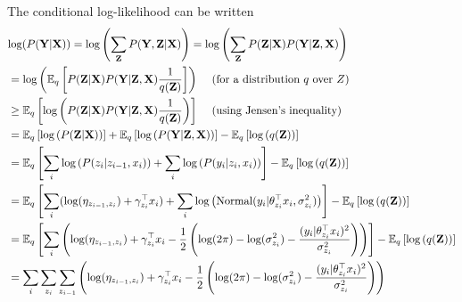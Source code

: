 \documentclass[12pt]{article}
\begin{document}
The conditional log-likelihood can be written
\begin{equation*}
    \begin{split}
        &\text{log}(P(\textbf{Y} | \textbf{X})) = \text{log} \left( \sum_{\textbf{Z}} P(\textbf{Y},\textbf{Z} | \textbf{X}) \right)
             = \text{log} \left( \sum_{\textbf{Z}} P(\textbf{Z} | \textbf{X}) P(\textbf{Y} | \textbf{Z}, \textbf{X}) \right)\\
        & =  \text{log} \left( \mathbb{E}_q \left[ P(\textbf{Z} | \textbf{X}) P(\textbf{Y} | \textbf{Z}, \textbf{X}) \frac{1}{q(\textbf{Z})} \right] \right)
             \text{ \hspace{3mm}(for a distribution $q$ over $Z$)}\\
        & \geq  \mathbb{E}_q \left[  \text{log} \left( P(\textbf{Z} | \textbf{X}) P(\textbf{Y} | \textbf{Z}, \textbf{X}) 
            \frac{1}{q(\textbf{Z})} \right) \right]
             \text{ \hspace{3mm}(using Jensen's inequality)}\\
        & = \mathbb{E}_q \left[ \text{log} \left( P(\textbf{Z} | \textbf{X}) \right) \right] 
             + \mathbb{E}_q \left[\text{log} \left( P(\textbf{Y} | \textbf{Z}, \textbf{X}) \right) \right] 
             - \mathbb{E}_q \left[\text{log} \left( q(\textbf{Z}) \right) \right] \\
        & = \mathbb{E}_q \left[ \sum_i \text{log} \left( P(z_i | z_{i-1}, x_i) \right)
             + \sum_i \text{log} \left( P(y_i | z_i, x_i) \right) \right] 
             - \mathbb{E}_q \left[\text{log} \left( q(\textbf{Z}) \right) \right] \\
        & = \mathbb{E}_q \left[ \sum_i (\text{log}(\eta_{z_{i-1},z_i}) + \gamma_{z_i}^{\top} x_i )
             + \sum_i \text{log} \left( \text{Normal}(y_i | \theta_{z_i}^{\top} x_i, \sigma_{z_i}^2) \right) \right] 
             - \mathbb{E}_q \left[\text{log} \left( q(\textbf{Z}) \right) \right] \\
        & = \mathbb{E}_q \left[ \sum_i \left( \text{log}(\eta_{z_{i-1},z_i}) + \gamma_{z_i}^{\top} x_i 
             -\frac{1}{2}\left( \text{log}(2\pi) - \text{log}(\sigma_{z_i}^2) - \frac{(y_i | \theta_{z_i}^{\top} x_i)^2}{ \sigma_{z_i}^2} \right)  \right) \right]
             - \mathbb{E}_q \left[\text{log} \left( q(\textbf{Z}) \right) \right] \\
         & =  \sum_i \sum_{z_i} \sum_{z_{i-1}} \left( \text{log}(\eta_{z_{i-1},z_i}) + \gamma_{z_i}^{\top} x_i 
             -\frac{1}{2}\left( \text{log}(2\pi) - \text{log}(\sigma_{z_i}^2) - \frac{(y_i | \theta_{z_i}^{\top} x_i)^2}{ \sigma_{z_i}^2} \right)  \right)

\end{split}
\end{equation*}
\end{document}
